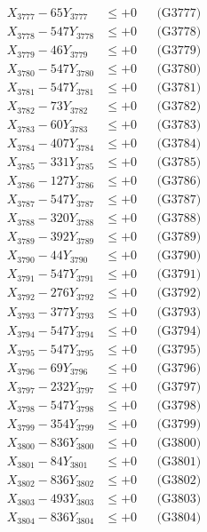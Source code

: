 \documentclass[a4paper,10pt]{article}
\begin{document}
{\begin{align}
X_{3777} - 65Y_{3777} &\leq +0 && \text{(G3777)} \\
X_{3778} - 547Y_{3778} &\leq +0 && \text{(G3778)} \\
X_{3779} - 46Y_{3779} &\leq +0 && \text{(G3779)} \\
X_{3780} - 547Y_{3780} &\leq +0 && \text{(G3780)} \\
\allowbreak
X_{3781} - 547Y_{3781} &\leq +0 && \text{(G3781)} \\
X_{3782} - 73Y_{3782} &\leq +0 && \text{(G3782)} \\
X_{3783} - 60Y_{3783} &\leq +0 && \text{(G3783)} \\
X_{3784} - 407Y_{3784} &\leq +0 && \text{(G3784)} \\
X_{3785} - 331Y_{3785} &\leq +0 && \text{(G3785)} \\
X_{3786} - 127Y_{3786} &\leq +0 && \text{(G3786)} \\
X_{3787} - 547Y_{3787} &\leq +0 && \text{(G3787)} \\
X_{3788} - 320Y_{3788} &\leq +0 && \text{(G3788)} \\
X_{3789} - 392Y_{3789} &\leq +0 && \text{(G3789)} \\
X_{3790} - 44Y_{3790} &\leq +0 && \text{(G3790)} \\
\allowbreak
X_{3791} - 547Y_{3791} &\leq +0 && \text{(G3791)} \\
X_{3792} - 276Y_{3792} &\leq +0 && \text{(G3792)} \\
X_{3793} - 377Y_{3793} &\leq +0 && \text{(G3793)} \\
X_{3794} - 547Y_{3794} &\leq +0 && \text{(G3794)} \\
X_{3795} - 547Y_{3795} &\leq +0 && \text{(G3795)} \\
X_{3796} - 69Y_{3796} &\leq +0 && \text{(G3796)} \\
X_{3797} - 232Y_{3797} &\leq +0 && \text{(G3797)} \\
X_{3798} - 547Y_{3798} &\leq +0 && \text{(G3798)} \\
X_{3799} - 354Y_{3799} &\leq +0 && \text{(G3799)} \\
X_{3800} - 836Y_{3800} &\leq +0 && \text{(G3800)} \\
\allowbreak
X_{3801} - 84Y_{3801} &\leq +0 && \text{(G3801)} \\
X_{3802} - 836Y_{3802} &\leq +0 && \text{(G3802)} \\
X_{3803} - 493Y_{3803} &\leq +0 && \text{(G3803)} \\
X_{3804} - 836Y_{3804} &\leq +0 && \text{(G3804)} \\

\end{align}}
\end{document}
